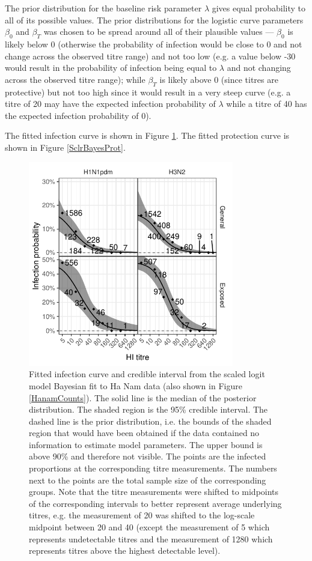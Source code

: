 \documentclass[12pt]{article}
\begin{document}
The prior distribution for the baseline risk parameter $\lambda$ gives equal probability to all of its possible values. The prior distributions for the logistic curve parameters $\beta_0$ and $\beta_T$ was chosen to be spread around all of their plausible values --- $\beta_0$ is likely below 0 (otherwise the probability of infection would be close to 0 and not change across the observed titre range) and not too low (e.g. a value below -30 would result in the probability of infection being equal to $\lambda$ and not changing across the observed titre range); while $\beta_T$ is likely above 0 (since titres are protective) but not too high since it would result in a very steep curve (e.g. a titre of 20 may have the expected infection probability of $\lambda$ while a titre of 40 has the expected infection probability of 0).

The fitted infection curve is shown in Figure \ref{SclrBayesInf}. The fitted protection curve is shown in Figure \ref{SclrBayesProt}.

\begin{figure}[htp]
	\centering
	\includegraphics[width=0.8\textwidth]{../fit-sclr-bayesian-plot/hanam-hi-inf.pdf}
	\caption{
	Fitted infection curve and credible interval from the scaled logit model Bayesian fit to Ha Nam data (also shown in Figure \ref{HanamCounts}). The solid line is the median of the posterior distribution. The shaded region is the 95\% credible interval. The dashed line is the prior distribution, i.e. the bounds of the shaded region that would have been obtained if the data contained no information to estimate model parameters. The upper bound is above 90\% and therefore not visible. The points are the infected proportions at the corresponding titre measurements. The numbers next to the points are the total sample size of the corresponding groups. Note that the titre measurements were shifted to midpoints of the corresponding intervals to better represent average underlying titres, e.g. the measurement of 20 was shifted to the log-scale midpoint between 20 and 40 (except the measurement of 5 which represents undetectable titres and the measurement of 1280 which represents titres above the highest detectable level).
	}
	\label{SclrBayesInf}
\end{figure}
\end{document}
